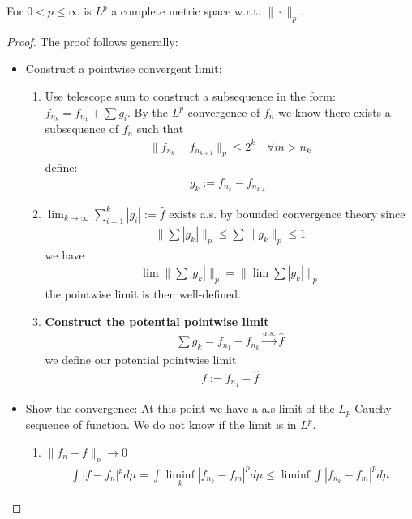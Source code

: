 \begin{theorem}
	For $0 < p \leq \infty$ is $L^p$ a complete metric space w.r.t. $\|\cdot\|_p$. 
\end{theorem}
\begin{proof}
	The proof follows generally:
	\begin{itemize}
		\item Construct a pointwise convergent limit:
			\begin{enumerate}
				\item Use telescope sum to construct a subsequence in the form: $f_{n_k} = f_{n_1} + \sum g_i$. By the $L^p$ convergence of $f_n$ we know there exists a subsequence of $f_n$ such that 
				\begin{align*}
					\|f_{n_k} - f_{n_{k+1}}\|_p \leq 2^k\quad \forall m > n_k				\end{align*}
				define:
				\begin{align*}
					g_k := f_{n_k} - f_{n_{k+1}}
				\end{align*}
				\item $\lim_{k \rightarrow \infty} \sum_{i = 1}^k | g_i| := \hat{f}$ exists a.s. by bounded convergence theory since
				\begin{align*}
					 \|\sum |g_k|\|_p \le \sum \|g_k\|_p \le 1
				\end{align*}
				we have
				\begin{align*}
					\lim \|\sum|g_k|\|_p = \|\lim \sum |g_k|\|_p
				\end{align*}
				the pointwise limit is then well-defined. 
				\item \textbf{Construct the potential pointwise limit} 
					\begin{align*}
						\sum g_k = f_{n_1} - f_{n_k} \overset{a.s.}{\longrightarrow}  \hat{f}
					\end{align*}
					we define our potential pointwise limit
					\begin{align*}
						f:=  f_{n_1} - \hat{f}
					\end{align*}
			\end{enumerate}
		\item Show the convergence: At this point we have a a.s limit of the $L_p$ Cauchy sequence of function. We do not know if the limit is in $L^p$.
		\begin{enumerate}
			\item $\|f_n - f \|_p \rightarrow 0$
			\begin{align*}
				\int |f - f_n|^p d\mu = \int \liminf_k |f_{n_k} - f_m|^p d\mu \leq \liminf \int |f_{n_k} - f_m|^p d\mu 

\end{align*}
\end{enumerate}
\end{itemize}
\end{proof}
